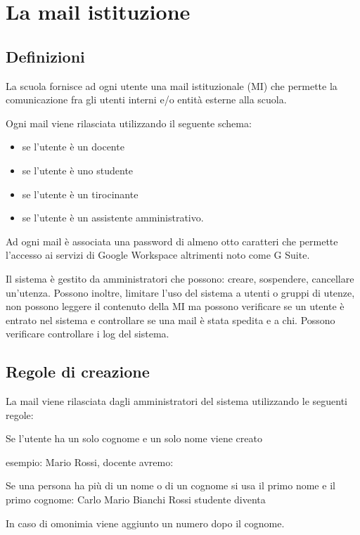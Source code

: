 \chapter{La mail istituzione}
\printpartialtoc
\section{Definizioni}
La scuola fornisce ad ogni utente una mail istituzionale (MI) che permette 
la comunicazione fra gli utenti interni e/o entità esterne alla scuola.

Ogni mail viene rilasciata utilizzando il seguente schema:
\begin{itemize}
	\item {} se l'utente è un docente
	\item {} se l'utente è uno studente
	\item {} se l'utente è un 
	tirocinante
	\item {} se l'utente è un 
	assistente 
	amministrativo.
\end{itemize}

Ad ogni mail è associata una password di almeno otto caratteri che permette 
l'accesso ai servizi di  \textenglish{Google Workspace} altrimenti noto come \textenglish{G Suite}.

Il sistema è gestito da amministratori che possono: creare, sospendere, cancellare un'utenza. Possono inoltre, limitare l'uso del sistema a utenti o gruppi di utenze, non possono leggere il contenuto della MI ma possono verificare se un utente è entrato nel sistema e controllare se una mail è stata spedita e a chi. 
Possono verificare controllare i log del sistema.

\section{Regole di creazione} 
La mail viene rilasciata dagli amministratori del sistema utilizzando le seguenti 
regole:

Se l'utente ha un solo cognome e un solo nome viene creato
\begin{center}
\end{center}
esempio: Mario Rossi, docente avremo:
\begin{center}
\end{center}
Se una persona ha più di un nome o di un cognome si usa il primo nome e il  
primo cognome: Carlo Mario Bianchi Rossi studente diventa
\begin{center}
\end{center}
In caso di omonimia viene aggiunto un numero dopo il cognome.
